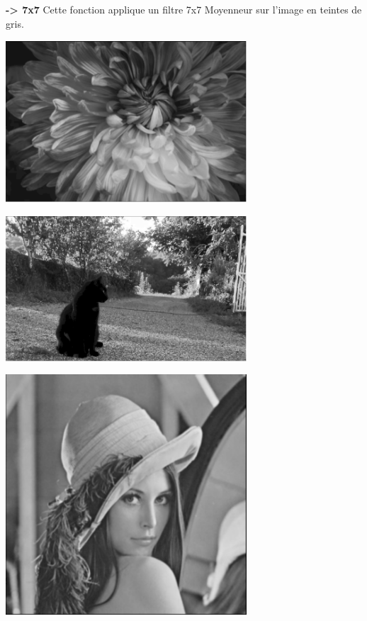 \documentclass{article}
\begin{document}
\textbf{-> 7x7}
Cette fonction applique un filtre 7x7 Moyenneur sur l'image en teintes de gris.

\begin{center} 
    \includegraphics[width=9cm]{../Image_fonctions/Multicolor/Average7.PNG}
\end{center}
\begin{center} 
    \includegraphics[width=9cm]{../Image_fonctions/Cat/Average7.PNG}
\end{center}
\begin{center} 
    \includegraphics[width=9cm]{../Image_fonctions/Lenna/Average7.PNG}
\end{center}
\end{document}
